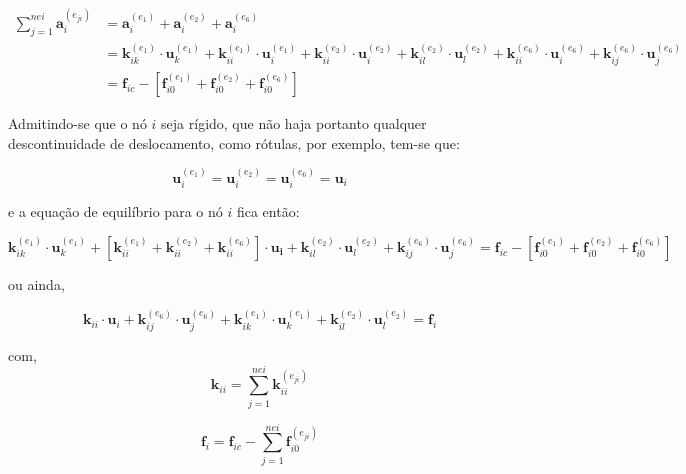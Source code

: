 \begin{align}
	\sum\limits_{j=1}^{nei}\mathbf{a}_{i}^{(e_{ji})}
	 & = \mathbf{a}_{i}^{(e_{1})}+\mathbf{a}_{i}^{(e_{2})}+\mathbf{a}_{i}^{(e_{6})} \nonumber                                                                                                                                                                                                                                                 \\
	 & = \mathbf{k}_{ik}^{(e_{1})} \cdot \mathbf{u}_{k}^{(e_{1})} + \mathbf{k}_{ii}^{(e_{1})} \cdot \mathbf{u}_{i}^{(e_{1})} + \mathbf{k}_{ii}^{(e_{2})} \cdot \mathbf{u}_{i}^{(e_{2})} + \mathbf{k}_{il}^{(e_{2})} \cdot \mathbf{u}_{l}^{(e_{2})} +\mathbf{k}_{ii}^{(e_{6})} \cdot \mathbf{u}_{i}^{(e_{6})} + \mathbf{k}_{ij}^{(e_{6})} \cdot \mathbf{u}_{j}^{(e_{6})} \nonumber \\
	 & = \mathbf{f}_{ic} - \left [ \mathbf{f}_{i0}^{(e_{1})}+\mathbf{f}_{i0}^{(e_{2})}+\mathbf{f}_{i0}^{(e_{6})}\right ]
\end{align}

\noindent Admitindo-se que o nó \(i\) seja rígido, que não haja portanto qualquer descontinuidade de deslocamento, como rótulas, por exemplo, tem-se que:

\[ \mathbf{u}_{i}^{(e_{1})}=\mathbf{u}_{i}^{(e_{2})}=\mathbf{u}_{i}^{(e_{6})}=\mathbf{u}_{i}\]

\noindent e a equação de equilíbrio para o nó \(i\) fica então:

\[\mathbf{k}_{ik}^{(e_{1})} \cdot \mathbf{u}_{k}^{(e_{1})} + \left [ \mathbf{k}_{ii}^{(e_{1})}+\mathbf{k}_{ii}^{(e_{2})}+\mathbf{k}_{ii}^{(e_{6})}\right ]\cdot \mathbf{u_{i}}+ \mathbf{k}_{il}^{(e_{2})} \cdot \mathbf{u}_{l}^{(e_{2})} + \mathbf{k}_{ij}^{(e_{6})} \cdot \mathbf{u}_{j}^{(e_{6})}=\mathbf{f}_{ic} - \left [ \mathbf{f}_{i0}^{(e_{1})}+\mathbf{f}_{i0}^{(e_{2})}+\mathbf{f}_{i0}^{(e_{6})}\right ] \]

ou ainda,

\[ \mathbf{k}_{ii}\cdot \mathbf{u}_i + \mathbf{k}_{ij}^{(e_{6})} \cdot \mathbf{u}_{j}^{(e_{6})} + \mathbf{k}_{ik}^{(e_{1})} \cdot \mathbf{u}_{k}^{(e_{1})} + \mathbf{k}_{il}^{(e_{2})} \cdot \mathbf{u}_{l}^{(e_{2})} = \mathbf{f}_i \]

com,
\[\mathbf{k}_{ii}=\sum\limits_{j=1}^{nei}\mathbf{k}_{ii}^{(e_{ji})}\]

\[\mathbf{f}_i=\mathbf{f}_{ic} - \sum\limits_{j=1}^{nei}\mathbf{f}_{i0}^{(e_{ji})}\]

\

